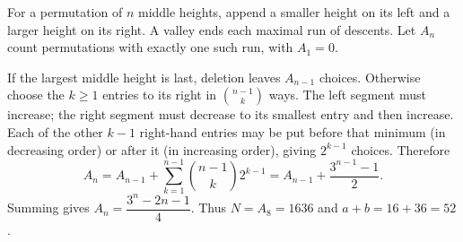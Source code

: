 For a permutation of $n$ middle heights, append a smaller height on its left and a larger height on its right. A valley ends each maximal run of descents. Let $A_n$ count permutations with exactly one such run, with $A_1=0$.

If the largest middle height is last, deletion leaves $A_{n-1}$ choices. Otherwise choose the $k\ge1$ entries to its right in $\binom{n-1}{k}$ ways. The left segment must increase; the right segment must decrease to its smallest entry and then increase. Each of the other $k-1$ right-hand entries may be put before that minimum (in decreasing order) or after it (in increasing order), giving $2^{k-1}$ choices. Therefore
\[A_n=A_{n-1}+\sum_{k=1}^{n-1}\binom{n-1}{k}2^{k-1}=A_{n-1}+\dfrac{3^{n-1}-1}{2}.\]
Summing gives $A_n=\dfrac{3^n-2n-1}{4}$. Thus $N=A_8=1636$ and $a+b=16+36=\boxed{52}$.
